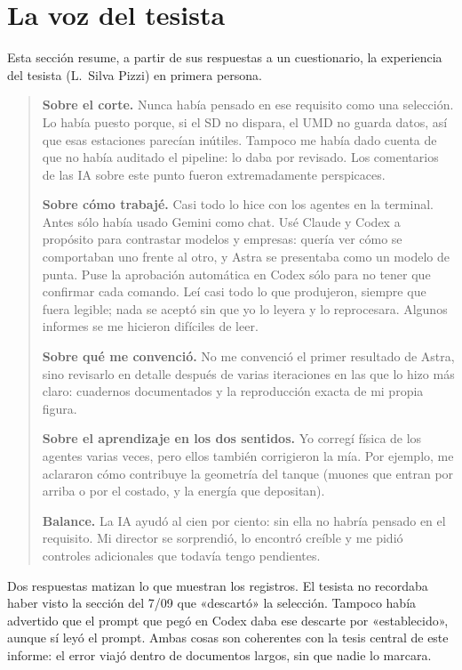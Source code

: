 \documentclass[11pt,a4paper]{article}
\begin{document}
\section{La voz del tesista}
Esta sección resume, a partir de sus respuestas a un cuestionario, la experiencia del tesista (L.~Silva
Pizzi) en primera persona.

\begin{quote}
\textbf{Sobre el corte.} Nunca había pensado en ese requisito como una selección. Lo había puesto porque, si
el SD no dispara, el UMD no guarda datos, así que esas estaciones parecían inútiles. Tampoco me había dado
cuenta de que no había auditado el pipeline: lo daba por revisado. Los comentarios de las IA sobre este
punto fueron extremadamente perspicaces.

\textbf{Sobre cómo trabajé.} Casi todo lo hice con los agentes en la terminal. Antes sólo había usado Gemini
como chat. Usé Claude y Codex a propósito para contrastar modelos y empresas: quería ver cómo se comportaban
uno frente al otro, y Astra se presentaba como un modelo de punta. Puse la aprobación automática en Codex
sólo para no tener que confirmar cada comando. Leí casi todo lo que produjeron, siempre que fuera legible;
nada se aceptó sin que yo lo leyera y lo reprocesara. Algunos informes se me hicieron difíciles de leer.

\textbf{Sobre qué me convenció.} No me convenció el primer resultado de Astra, sino revisarlo en detalle
después de varias iteraciones en las que lo hizo más claro: cuadernos documentados y la reproducción exacta
de mi propia figura.

\textbf{Sobre el aprendizaje en los dos sentidos.} Yo corregí física de los agentes varias veces, pero ellos
también corrigieron la mía. Por ejemplo, me aclararon cómo contribuye la geometría del tanque (muones que
entran por arriba o por el costado, y la energía que depositan).

\textbf{Balance.} La IA ayudó al cien por ciento: sin ella no habría pensado en el requisito. Mi director se
sorprendió, lo encontró creíble y me pidió controles adicionales que todavía tengo pendientes.
\end{quote}

\noindent Dos respuestas matizan lo que muestran los registros. El tesista no recordaba haber visto la sección
del 7/09 que «descartó» la selección. Tampoco había advertido que el prompt que pegó en Codex daba ese
descarte por «establecido», aunque sí leyó el prompt. Ambas cosas son coherentes con la tesis central de este
informe: el error viajó dentro de documentos largos, sin que nadie lo marcara.
\end{document}
